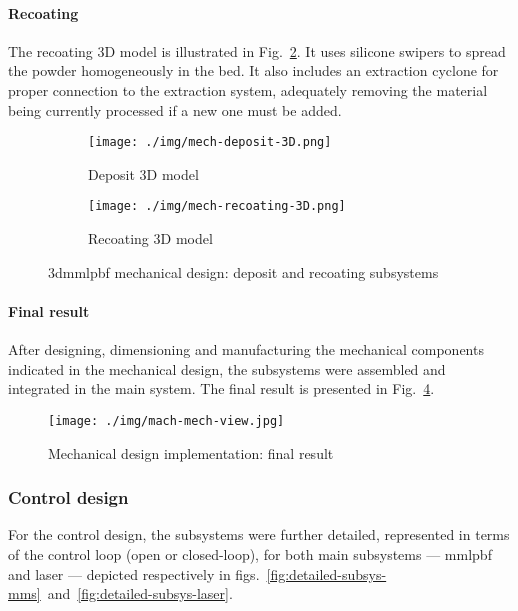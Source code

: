 \paragraph{Recoating}
The recoating 3D model is illustrated in Fig.~\ref{fig:mech-recoating-3D}. It
uses silicone swipers to spread the powder homogeneously in the bed. It also
includes an extraction cyclone for proper connection to the extraction system,
adequately removing the material being currently processed if a new one must be
added.

\begin{figure}[htb!]
  \centering
\begin{subfigure}[t]{0.4\textwidth}
  \centering
  \texttt{[image: ./img/mech-deposit-3D.png]}
  \caption{Deposit 3D model}%
  \label{fig:mech-deposit-3D}
\end{subfigure}
%
\begin{subfigure}[t]{0.4\textwidth}
  \centering
  \texttt{[image: ./img/mech-recoating-3D.png]}
  \caption{Recoating 3D model}%
  \label{fig:mech-recoating-3D}
\end{subfigure}
  \caption{\gls{3dmmlpbf} mechanical design: deposit and recoating subsystems}%
  \label{fig:mech-design-deposit-recoating}
\end{figure}


\paragraph{Final result}
After designing, dimensioning and manufacturing the mechanical components
indicated in the mechanical design, the subsystems were assembled and integrated
in the main system.
The final result is presented in Fig.~\ref{fig:mech-final}.

\begin{figure}[!hbt]
  \centering
  \texttt{[image: ./img/mach-mech-view.jpg]}
  \caption{Mechanical design implementation: final result}
  \label{fig:mech-final}
\end{figure}

\subsubsection{Control design}%
\label{subsubsec:electr-contr-design}
% 
For the control design, the subsystems were further detailed, represented in
terms of the control loop (open or closed-loop), for both main subsystems ---
\gls{mmlpbf} and laser --- depicted respectively in
figs.~\ref{fig:detailed-subsys-mms}~and~\ref{fig:detailed-subsys-laser}.


